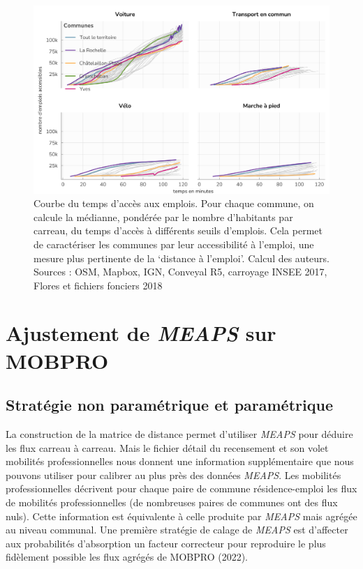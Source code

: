 \documentclass[
  10pt,
  a4paper,
  numbers=noendperiod,
  DIV=9]{scrreprt}
\begin{document}
\begin{figure}[htb]

{\centering \includegraphics[width=1\textwidth,height=\textheight]{./larochelle_files/figure-pdf/fig-comaccess-1.png}

}

\caption[Accessibilité par communes pour la
Rochelle]{\label{fig-comaccess}Courbe du temps d'accès aux emplois. Pour
chaque commune, on calcule la médianne, pondérée par le nombre
d'habitants par carreau, du temps d'accès à différents seuils d'emplois.
Cela permet de caractériser les communes par leur accessibilité à
l'emploi, une mesure plus pertinente de la `distance à l'emploi'. Calcul
des auteurs. Sources : OSM, Mapbox, IGN, Conveyal R5, carroyage INSEE
2017, Flores et fichiers fonciers 2018}

\end{figure}

\hypertarget{sec-ajust}{%
\section{\texorpdfstring{Ajustement de \emph{MEAPS} sur
MOBPRO}{Ajustement de MEAPS sur MOBPRO}}\label{sec-ajust}}

\hypertarget{stratuxe9gie-non-paramuxe9trique-et-paramuxe9trique}{%
\subsection{Stratégie non paramétrique et
paramétrique}\label{stratuxe9gie-non-paramuxe9trique-et-paramuxe9trique}}

La construction de la matrice de distance permet d'utiliser \emph{MEAPS}
pour déduire les flux carreau à carreau. Mais le fichier détail du
recensement et son volet mobilités professionnelles nous donnent une
information supplémentaire que nous pouvons utiliser pour calibrer au
plus près des données \emph{MEAPS}. Les mobilités professionnelles
décrivent pour chaque paire de commune résidence-emploi les flux de
mobilités professionnelles (de nombreuses paires de communes ont des
flux nuls). Cette information est équivalente à celle produite par
\emph{MEAPS} mais agrégée au niveau communal. Une première stratégie de
calage de \emph{MEAPS} est d'affecter aux probabilités d'absorption un
facteur correcteur pour reproduire le plus fidèlement possible les flux
agrégés de MOBPRO (2022).
\end{document}
